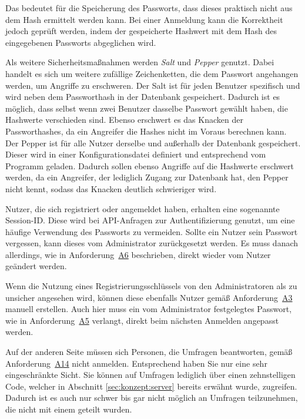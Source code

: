 Das bedeutet für die Speicherung des Passworts, dass dieses praktisch nicht aus dem Hash ermittelt werden kann.
Bei einer Anmeldung kann die Korrektheit jedoch geprüft werden, indem der gespeicherte Hashwert mit dem Hash des eingegebenen Passworts abgeglichen wird.

Als weitere Sicherheitsmaßnahmen werden \emph{Salt} und \emph{Pepper} genutzt.
Dabei handelt es sich um weitere zufällige Zeichenketten, die dem Passwort angehangen werden, um Angriffe zu erschweren.
Der Salt ist für jeden Benutzer spezifisch und wird neben dem Passworthash in der Datenbank gespeichert.
Dadurch ist es möglich, dass selbst wenn zwei Benutzer dasselbe Passwort gewählt haben, die Hashwerte verschieden sind.
Ebenso erschwert es das Knacken der Passworthashes, da ein Angreifer die Hashes nicht im Voraus berechnen kann.
Der Pepper ist für alle Nutzer derselbe und außerhalb der Datenbank gespeichert.
Dieser wird in einer Konfigurationsdatei definiert und entsprechend vom Programm geladen.
Dadurch sollen ebenso Angriffe auf die Hashwerte erschwert werden, da ein Angreifer, der lediglich Zugang zur Datenbank hat, den Pepper nicht kennt, sodass das Knacken deutlich schwieriger wird.

Nutzer, die sich registriert oder angemeldet haben, erhalten eine sogenannte Session-ID.
Diese wird bei \acs{API}-Anfragen zur Authentifizierung genutzt, um eine häufige Verwendung des Passworts zu vermeiden.
Sollte ein Nutzer sein Passwort vergessen, kann dieses vom Administrator zurückgesetzt werden.
Es muss danach allerdings, wie in Anforderung~\hyperref[Anf:A6]{A6} beschrieben, direkt wieder vom Nutzer geändert werden.

Wenn die Nutzung eines Registrierungsschlüssels von den Administratoren als zu unsicher angesehen wird, können diese ebenfalls Nutzer gemäß Anforderung~\hyperref[Anf:A3]{A3} manuell erstellen.
Auch hier muss ein vom Administrator festgelegtes Passwort, wie in Anforderung~\hyperref[Anf:A5]{A5} verlangt, direkt beim nächsten Anmelden angepasst werden.

Auf der anderen Seite müssen sich Personen, die Umfragen beantworten, gemäß Anforderung~\hyperref[Anf:A14]{A14} nicht anmelden.
Entsprechend haben Sie nur eine sehr eingeschränkte Sicht.
Sie können auf Umfragen lediglich über einen zehnstelligen Code, welcher in Abschnitt \ref{sec:konzept:server} bereits erwähnt wurde, zugreifen.
Dadurch ist es auch nur schwer bis gar nicht möglich an Umfragen teilzunehmen, die nicht mit einem geteilt wurden.
